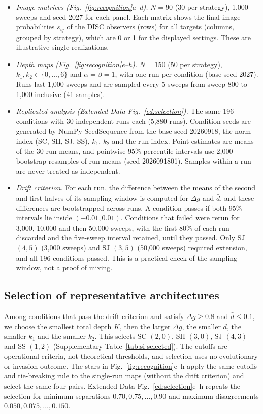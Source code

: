 \documentclass[10pt]{wlscirep}
\theoremstyle{plain}
\theoremstyle{remark}
\begin{document}
\begin{itemize}
\item \textit{Image matrices (Fig.~\ref{fig:recognition}a--d).} $N=90$ (30 per strategy), 1,000 sweeps and seed 2027 for each panel. Each matrix shows the final image probabilities $s_{ij}$ of the DISC observers (rows) for all targets (columns, grouped by strategy), which are 0 or 1 for the displayed settings. These are illustrative single realizations.
\item \textit{Depth maps (Fig.~\ref{fig:recognition}e--h).} $N=150$ (50 per strategy), $k_1,k_2\in\{0,\ldots,6\}$ and $\alpha=\beta=1$, with one run per condition (base seed 2027). Runs last 1,000 sweeps and are sampled every 5 sweeps from sweep 800 to 1,000 inclusive (41 samples).
\item \textit{Replicated analysis (Extended Data Fig.~\ref{ed:selection}).} The same 196 conditions with 30 independent runs each (5,880 runs). Condition seeds are generated by NumPy SeedSequence from the base seed 20260918, the norm index (SC, SH, SJ, SS), $k_1$, $k_2$ and the run index. Point estimates are means of the 30 run means, and pointwise 95\% percentile intervals use 2,000 bootstrap resamples of run means (seed 2026091801). Samples within a run are never treated as independent.
\item \textit{Drift criterion.} For each run, the difference between the means of the second and first halves of its sampling window is computed for $\Delta g$ and $\bar d$, and these differences are bootstrapped across runs. A condition passes if both 95\% intervals lie inside $(-0.01,0.01)$. Conditions that failed were rerun for 3,000, 10,000 and then 50,000 sweeps, with the first 80\% of each run discarded and the five-sweep interval retained, until they passed. Only SJ $(4,5)$ (3,000 sweeps) and SJ $(3,5)$ (50,000 sweeps) required extension, and all 196 conditions passed. This is a practical check of the sampling window, not a proof of mixing.
\end{itemize}

\subsection{Selection of representative architectures}

Among conditions that pass the drift criterion and satisfy $\Delta g\geq0.8$ and $\bar d\leq0.1$, we choose the smallest total depth $K$, then the larger $\Delta g$, the smaller $\bar d$, the smaller $k_1$ and the smaller $k_2$. This selects SC $(2,0)$, SH $(3,0)$, SJ $(4,3)$ and SS $(1,2)$ (Supplementary Table~\ref{tab:si-selected}). The cutoffs are operational criteria, not theoretical thresholds, and selection uses no evolutionary or invasion outcome. The stars in Fig.~\ref{fig:recognition}e--h apply the same cutoffs and tie-breaking rule to the single-run maps (without the drift criterion) and select the same four pairs. Extended Data Fig.~\ref{ed:selection}e--h repeats the selection for minimum separations $0.70,0.75,\ldots,0.90$ and maximum disagreements $0.050,0.075,\ldots,0.150$.
\end{document}
